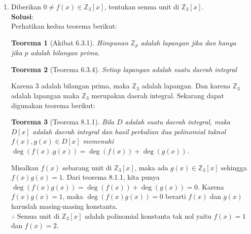 \documentclass[10pt,openany,a4paper]{article}
\newtheorem*{teorema}{Teorema}
\newcommand{\Z}{\mathbb{Z}}
\newcommand{\jawab}{\textbf{Solusi}:}
\begin{document}
\begin{enumerate}
    \item Diberikan $0\ne f(x)\in\Z_3[x]$, tentukan semua unit di $\Z_3[x]$.\\
    \jawab\\
    Perhatikan kedua teorema berikut:
    \begin{teorema}[Akibat 6.3.1]
        Himpunan $\Z_p$ adalah lapangan jika dan hanya jika $p$ adalah bilangan prima.
    \end{teorema}
    \vspace*{-0.5cm}
    \begin{teorema}[Teorema 6.3.4]
        Setiap lapangan adalah suatu daerah integral
    \end{teorema}
    Karena $3$ adalah bilangan prima, maka $\Z_3$ adalah lapangan. Dan karena $\Z_3$ adalah lapangan maka $\Z_3$ merupakan daerah integral.
    Sekarang dapat digunakan teorema berikut:
    \begin{teorema}[Teorema 8.1.1]
        Bila $D$ adalah suatu daerah integral, maka $D[x]$ adalah daerah integral dan hasil 
        perkalian dua polinomial taknol $f (x), g(x) \in D[x]$ memenuhi $\deg( f (x).g(x)) = \deg( f (x))+ \deg(g(x))$.
    \end{teorema}
    Misalkan $f(x)$ sebarang unit di $\Z_3[x]$, maka ada $g(x)\in\Z_3[x]$ sehingga $f(x)g(x)=1$. Dari 
    teorema 8.1.1, kita punya $\deg(f(x)g(x))=\deg(f(x))+\deg(g(x))=0$. Karena $f(x)g(x)=1$, 
    maka $\deg(f(x)g(x))=0$ berarti $f(x)$ dan $g(x)$ haruslah masing-masing konstanta.\\
    $\therefore$ Semua unit di $\Z_3[x]$ adalah polinomial konstanta tak nol yaitu $f(x)=1$ dan $f(x)=2$.


\end{enumerate}
\end{document}
